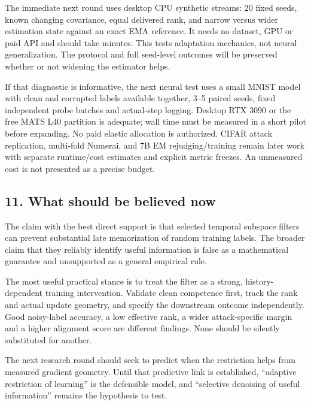 \documentclass[
  british,
  10pt,
  a4paper,
]{article}
\begin{document}
The immediate next round uses desktop CPU synthetic streams: 20 fixed
seeds, known changing covariance,\allowbreak{} equal delivered rank, and
narrow versus wider estimation state against an exact EMA reference. It
needs no dataset, GPU or paid API and should take minutes. This tests
adaptation mechanics, not neural
generalizati\allowbreak{}on.\allowbreak{} The protocol and full
seed-level outcomes will be preserved whether or not widening the
estimator helps.

If that diagnostic is informative,\allowbreak{} the next neural test
uses a small MNIST model with clean and corrupted labels available
together, 3--5 paired seeds, fixed independent probe batches and
actual-\allowbreak{}step logging. Desktop RTX 3090 or the free MATS L40
partition is adequate; wall time must be measured in a short pilot
before expanding. No paid elastic allocation is authorized.\allowbreak{}
CIFAR attack replication,\allowbreak{} multi-fold Numerai, and 7B EM
rejudging/\allowbreak{}training remain later work with separate
runtime/\allowbreak{}cost estimates and explicit metric freezes. An
unmeasured cost is not presented as a precise budget.

\subsection{11. What should be believed
now}\label{synthesis--what-should-be-believed-now}

The claim with the best direct support is that selected temporal
subspace filters can prevent substantial late memorization of random
training labels. The broader claim that they reliably identify useful
information is false as a mathematical guarantee and unsupported as a
general empirical rule.

The most useful practical stance is to treat the filter as a strong,
history-\allowbreak{}dependent training
intervention\allowbreak{}.\allowbreak{} Validate clean competence first,
track the rank and actual update geometry, and specify the downstream
outcome independentl\allowbreak{}y.\allowbreak{} Good
noisy-\allowbreak{}label accuracy, a low effective rank, a wider
attack-\allowbreak{}specific margin and a higher alignment score are
different findings. None should be silently substituted for another.

The next research round should seek to predict when the restriction
helps from measured gradient geometry. Until that predictive link is
established,\allowbreak{} ``adaptive restriction of learning'' is the
defensible model, and ``selective denoising of useful information''
remains the hypothesis to test.
\end{document}
